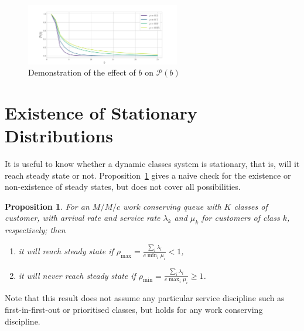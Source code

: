 \documentclass{article}
\newtheorem{prop}{Proposition}
\begin{document}
\begin{figure}[!htbp]
  \begin{center}
    \includegraphics[width=0.6\textwidth]{img/hitting_check.pdf}
  \end{center}
  \caption{Demonstration of the effect of $b$ on $\mathcal{P}(b)$}
  \label{fig:hitting_measure}
\end{figure}






\section{Existence of Stationary Distributions}\label{sec:stationary}
It is useful to know whether a dynamic classes system is stationary, that is,
will it reach steady state or not. Proposition~\ref{thrm:steadystate} gives a
naive check for the existence or non-existence of steady states, but does not
cover all possibilities.

\begin{prop}\label{thrm:steadystate}
For an $M/M/c$ work conserving queue with $K$ classes of customer, with arrival
rate and service rate $\lambda_k$ and  $\mu_k$ for customers of class $k$,
respectively; then
\begin{enumerate}
  \item it will reach steady state if
  $\rho_{\max} = \frac{\sum_i \lambda_i}{c \min_i \mu_i} < 1$,
  \item it will never reach steady state if
  $\rho_{\min} = \frac{\sum_i \lambda_i}{c \max_i \mu_i} \geq 1$.
\end{enumerate}
\end{prop}

Note that this result does not assume any particular service discipline such as
first-in-first-out or prioritised classes, but holds for any work conserving
discipline.
\end{document}
